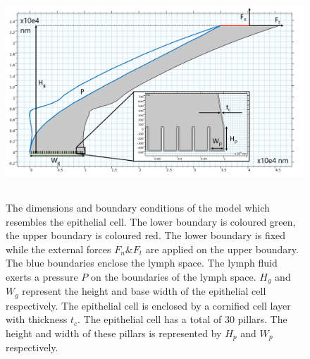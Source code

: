 \begin{figure}[h!]
    \includegraphics[width=0.9\linewidth, height=8cm, angle=0]{images/HGO_model_geometry/BC_HGO_model.png}
    \caption{The dimensions and boundary conditions of the model which resembles the epithelial cell. The lower boundary is coloured green, the upper boundary is coloured red. The lower boundary is fixed while the external forces $F_{n} \& F_{t}$ are applied on the upper boundary. The blue boundaries enclose the lymph space. The lymph fluid exerts a pressure $P$ on the boundaries of the lymph space. $H_{g}$ and $W_g$ represent the height and base width of the epithelial cell respectively. The epithelial cell is enclosed by a cornified cell layer with thickness $t_{c}$. The epithelial cell has a total of 30 pillars. The height and width of these pillars is represented by $H_{p}$ and $W_{p}$ respectively.}
    \label{fig:BC_HGO_model}
\end{figure}

